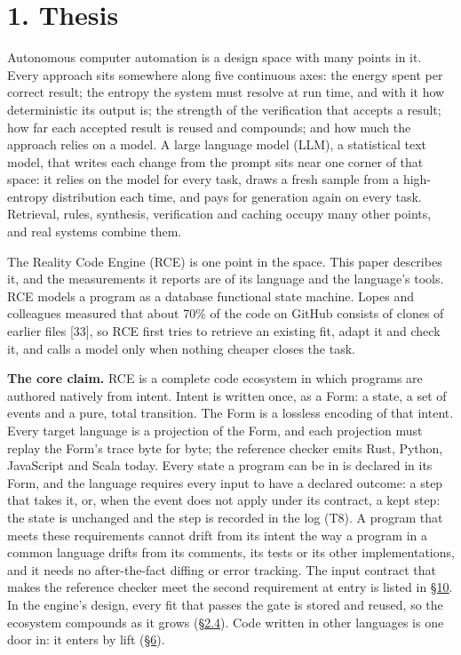\documentclass[10pt,letterpaper]{article}
\begin{document}
\section{1. Thesis}\label{thesis}

Autonomous computer automation is a design space with many points in it.
Every approach sits somewhere along five continuous axes: the energy
spent per correct result; the entropy the system must resolve at run
time, and with it how deterministic its output is; the strength of the
verification that accepts a result; how far each accepted result is
reused and compounds; and how much the approach relies on a model. A
large language model (LLM), a statistical text model, that writes each
change from the prompt sits near one corner of that space: it relies on
the model for every task, draws a fresh sample from a high-entropy
distribution each time, and pays for generation again on every task.
Retrieval, rules, synthesis, verification and caching occupy many other
points, and real systems combine them.

The Reality Code Engine (RCE) is one point in the space. This paper
describes it, and the measurements it reports are of its language and
the language's tools. RCE models a program as a database functional
state machine. Lopes and colleagues measured that about 70\% of the code
on GitHub consists of clones of earlier files {[}33{]}, so RCE first
tries to retrieve an existing fit, adapt it and check it, and calls a
model only when nothing cheaper closes the task.

\textbf{The core claim.} RCE is a complete code ecosystem in which
programs are authored natively from intent. Intent is written once, as a
Form: a state, a set of events and a pure, total transition. The Form is
a lossless encoding of that intent. Every target language is a
projection of the Form, and each projection must replay the Form's trace
byte for byte; the reference checker emits Rust, Python, JavaScript and
Scala today. Every state a program can be in is declared in its Form,
and the language requires every input to have a declared outcome: a step
that takes it, or, when the event does not apply under its contract, a
kept step: the state is unchanged and the step is recorded in the log
(T8). A program that meets these requirements cannot drift from its
intent the way a program in a common language drifts from its comments,
its tests or its other implementations, and it needs no after-the-fact
diffing or error tracking. The input contract that makes the reference
checker meet the second requirement at entry is listed in
\href{https://research.openie.dev/papers/rce/\#10-work-to-finish}{§10}.
In the engine's design, every fit that passes the gate is stored and
reused, so the ecosystem compounds as it grows
(\href{https://research.openie.dev/papers/rce/\#24-gated-verified-recursive-self-improvement}{§2.4}).
Code written in other languages is one door in: it enters by lift
(\href{https://research.openie.dev/papers/rce/\#6-lift-entering-the-ecosystem-from-other-languages}{§6}).
\end{document}
